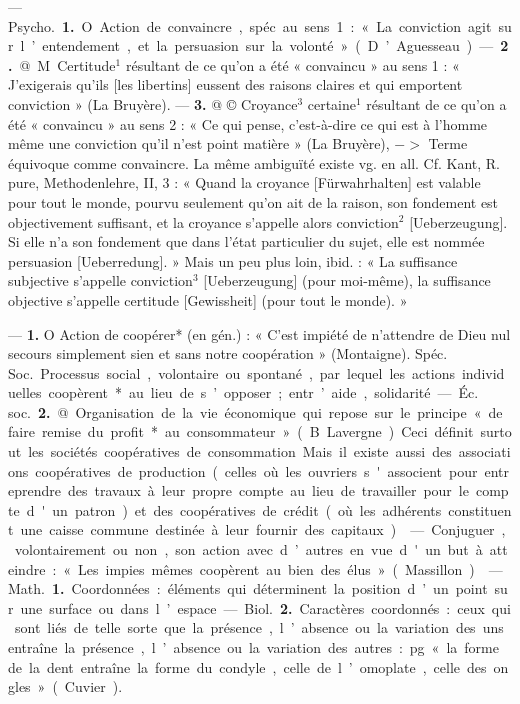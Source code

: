 \begin{itemize}[leftmargin=1cm, label=, itemsep=11pt]
 — \si{Psycho.} {\bf 1.} O Action de
convaincre, spéc. au sens 1 : « La
conviction agit sur l’entendement,
et la persuasion sur la volonté »
(D’Aguesseau). —  {\bf 2.} @ M Certitude$^1$
résultant de ce qu’on a été « convaincu » au sens 1 : « J’exigerais
qu'ils [les libertins] eussent des raisons claires et qui emportent conviction » (La Bruyère). —  {\bf 3.} @ ©
Croyance$^3$ certaine$^1$ résultant de ce
qu’on a été « convaincu » au sens 2 :
« Ce qui pense, c’est-à-dire ce qui
est à l’homme même une conviction
qu’il n’est point matière » (La
Bruyère), $->$ Terme équivoque
comme convaincre. La même ambiguïté existe vg. en all. Cf. Kant,
R. pure, Methodenlehre, II, 3 :
« Quand la croyance [Fürwahrhalten] est valable pour tout le monde,
pourvu seulement qu’on ait de la
raison, son fondement est objectivement suffisant, et la croyance
s’appelle alors conviction$^2$ [Ueberzeugung]. Si elle n’a son fondement
que dans l’état particulier du sujet,
elle est nommée persuasion [Ueberredung]. » Mais un peu plus loin, ibid. :
« La suffisance subjective s'appelle
conviction$^3$ [Ueberzeugung] (pour
moi-même), la suffisance objective
s’appelle certitude [Gewissheit] (pour
tout le monde). »

 — {\bf 1.} O Action de coopérer* (en gén.) : « C’est impiété de
n'attendre de Dieu nul secours simplement sien et sans notre coopération » (Montaigne). Spéc. \si{Soc.} Processus social, volontaire ou spontané, par lequel les actions individuelles coopèrent* au lieu de s’opposer; entr’aide, solidarité.

— \si{Éc. soc.}  {\bf 2.} @ Organisation de
la vie économique qui repose sur le
principe « de faire remise du profit
*au consommateur » (B. Lavergne).
Ceci définit surtout les sociétés
coopératives de consommation. Mais
il existe aussi des associations coopératives de production (celles où les
ouvriers s'associent pour entreprendre des travaux à leur propre
compte au lieu de travailler pour le
compte d'un patron) et des coopératives de crédit (où les adhérents
constituent une caisse commune
destinée à leur fournir des capitaux).

 — Conjuguer, volontairement ou non, son action avec d’autres en vue d'un but à atteindre :
« Les impies mêmes coopèrent au
bien des élus » (Massillon).

 — \si{Math.} {\bf 1.} Coordonnées :
éléments qui déterminent la position d’un point sur une surface ou
dans l’espace.

— \si{Biol.}  {\bf 2.} Caractères coordonnés :
ceux qui sont liés de telle sorte que
la présence, l’absence ou la variation
des uns entraîne la présence, l’absence ou la variation des autres : pg.
« la forme de la dent entraîne la
forme du condyle, celle de l’omoplate, celle des ongles » (Cuvier).


\end{itemize}
